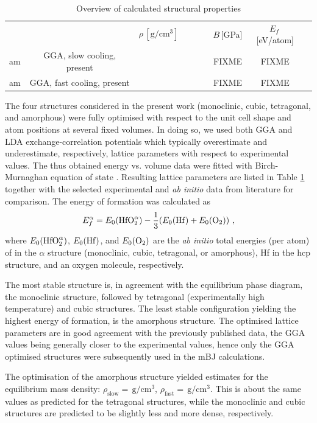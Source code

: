 \documentclass[10pt,a4paper,twocolumn]{article}
\begin{document}
\begin{table}
\begin{center}
\begin{tabular}{ccccccccc}

 & &  $\rho\,[\mathrm{g/cm^3}]$ & & & & $B$\,[GPa] & $E_f$\,[eV/atom] & \\
 am & GGA, slow cooling, present &  & & & & FIXME & FIXME & \\ %
 am & GGA, fast cooling, present &  & & & & FIXME & FIXME &\\ %

\end{tabular}
\caption{Overview of calculated structural properties}
\label{structure}
\end{center}
\end{table}

The four structures considered in the present work (monoclinic, cubic, tetragonal, and amorphous) were fully optimised with respect to the unit cell shape and atom positions at several fixed volumes.
In doing so, we used both GGA and LDA exchange-correlation potentials which typically overestimate and underestimate, respectively, lattice parameters with respect to experimental values.
The thus obtained energy vs. volume data were fitted with Birch-Murnaghan equation of state \cite{Birch1947}.
Resulting lattice parameters are listed in Table \ref{structure} together with the selected experimental and \textit{ab initio} data from literature for comparison.
The energy of formation was calculated as
\begin{equation}
  E_f^\alpha=E_0(\ce{HfO2}^\alpha) - \frac13 (E_0(\ce{Hf}) + E_0(\ce{O2}))\ ,
\end{equation}
where $E_0(\ce{HfO2}^\alpha)$, $E_0(\ce{Hf})$, and $E_0(\ce{O2})$ are the \textit{ab initio} total energies (per atom) of  in the $\alpha$ structure (monoclinic, cubic, tetragonal, or amorphous), Hf in the hcp structure, and an oxygen molecule, respectively.

The most stable structure is, in agreement with the equilibrium phase diagram, the monoclinic structure, followed by tetragonal (experimentally high temperature) and cubic structures.
The least stable configuration yielding the highest energy of formation, is the amorphous structure.
The optimised lattice parameters are in good agreement with the previously published data, the GGA values being generally closer to the experimental values, hence only the GGA optimised structures were subsequently used in the mBJ calculations.

The optimisation of the amorphous structure yielded estimates for the equilibrium mass density: $\rho_{\mathrm{slow}}=\,\mathrm{g/cm^3}$, $\rho_{\mathrm{fast}}=\,\mathrm{g/cm^3}$. %
This is about the same values as predicted for the tetragonal structures, while the monoclinic and cubic structures are predicted to be slightly less and more dense, respectively.
\end{document}
